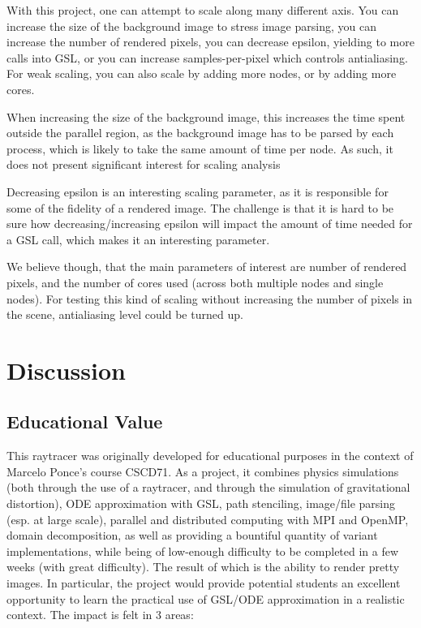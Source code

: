 With this project, one can attempt to scale along many different axis. You can increase the size of the background image to stress image parsing, you can increase the number of rendered pixels, you can decrease epsilon, yielding to more calls into GSL, or you can increase samples-per-pixel which controls antialiasing. For weak scaling, you can also scale by adding more nodes, or by adding more cores. 

When increasing the size of the background image, this increases the time spent outside the parallel region, as the background image has to be parsed by each process, which is likely to take the same amount of time per node. As such, it does not present significant interest for scaling analysis

Decreasing epsilon is an interesting scaling parameter, as it is responsible for some of the fidelity of a rendered image. The challenge is that it is hard to be sure how decreasing/increasing epsilon will impact the amount of time needed for a GSL call, which makes it an interesting parameter.

We believe though, that the main parameters of interest are number of rendered pixels, and the number of cores used (across both multiple nodes and single nodes). For testing this kind of scaling without increasing the number of pixels in the scene, antialiasing level could be turned up.






\section{Discussion}
\label{sec:disc}

\subsection {Educational Value}


This raytracer was originally developed for educational purposes in the context of Marcelo Ponce's course CSCD71. As a project, it combines physics simulations (both through the use of a raytracer, and through the simulation of gravitational distortion), ODE approximation with GSL, path stenciling, image/file parsing (esp. at large scale), parallel and distributed computing with MPI and OpenMP, domain decomposition, as well as providing a bountiful quantity of variant implementations, while being of low-enough difficulty to be completed in a few weeks (with great difficulty). The result of which is the ability to render pretty images. In particular, the project would provide potential students an excellent opportunity to learn the practical use of GSL/ODE approximation in a realistic context. The impact is felt in 3 areas:

